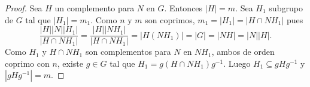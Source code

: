 \begin{proof}
	Sea $H$ un complemento para $N$ en $G$. Entonces $|H|=m$. Sea $H_1$
	subgrupo de $G$ tal que $|H_1|=m_1$. 
	Como $n$ y $m$ son coprimos, $m_1=|H_1|=|H\cap NH_1|$ pues
	\[
	\frac{|H||N||H_1|}{|H\cap NH_1|}=
	\frac{|H||NH_1|}{|H\cap NH_1|}=|H(NH_1)|=|G|=|NH|=|N||H|.
	\]
	Como $H_1$ y $H\cap NH_1$ son complementos para $N$ en $NH_1$, ambos de
	orden coprimo con $n$, existe $g\in G$ tal que $H_1=g(H\cap NH_1)g^{-1}$. Luego 
	$H_1\subseteq gHg^{-1}$ y $|gHg^{-1}|=m$. 
\end{proof}

